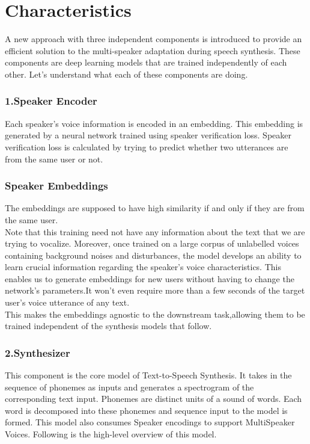 \documentclass[12pt]{report}
\begin{document}
\section{Characteristics}
A new approach with three independent components is introduced to provide an efficient solution to the multi-speaker adaptation during speech synthesis. These components are deep learning models that are trained independently of each other. Let’s understand what each of these components are doing.\\

\subsubsection{1.Speaker Encoder}
Each speaker’s voice information is encoded in an embedding. This embedding is generated by a neural network trained using speaker verification loss. Speaker verification loss is calculated by trying to predict whether two utterances are from the same user or not.

\subsubsection{Speaker Embeddings}
The embeddings are supposed to have high similarity if and only if they are from the same user.\\

Note that this training need not have any information about the text that we are trying to vocalize. Moreover, once trained on a large corpus of unlabelled voices containing background noises and disturbances, the model develops an ability to learn crucial information regarding the speaker’s voice characteristics. This enables us to generate embeddings for new users without having to change the network’s parameters.It won’t even require more than a few seconds of the target user’s voice utterance of any text.\\

This makes the embeddings agnostic to the downstream task,allowing them to be trained independent of the synthesis models that follow.

\subsubsection{2.Synthesizer}
This component is the core model of Text-to-Speech Synthesis. It takes in the sequence of phonemes as inputs and generates a spectrogram of the corresponding text input. Phonemes are distinct units of a sound of words. Each word is decomposed into these phonemes and sequence input to the model is formed. This model also consumes Speaker encodings to support MultiSpeaker Voices. Following is the high-level overview of this model.\\
\end{document}
